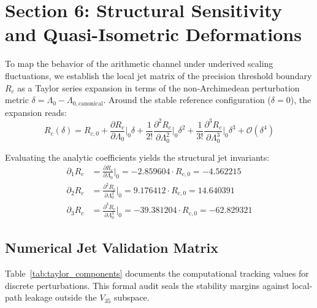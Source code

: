 \section{Section 6: Structural Sensitivity and Quasi-Isometric Deformations}
\label{sec:structural_sensitivity}

To map the behavior of the arithmetic channel under underived scaling fluctuations, we establish the local jet matrix of the precision threshold boundary $R_c$ as a Taylor series expansion in terms of the non-Archimedean perturbation metric $\delta = \Lambda_0 - \Lambda_{0,\text{canonical}}$. Around the stable reference configuration ($\delta = 0$), the expansion reads:
\begin{equation}
R_c(\delta) = R_{c,0} + \frac{\partial R_c}{\partial \Lambda_0}\bigg|_{0}\delta + \frac{1}{2!}\frac{\partial^2 R_c}{\partial \Lambda_0^2}\bigg|_{0}\delta^2 + \frac{1}{3!}\frac{\partial^3 R_c}{\partial \Lambda_0^3}\bigg|_{0}\delta^3 + \mathcal{O}(\delta^4)
\end{equation}

Evaluating the analytic coefficients yields the structural jet invariants:
\begin{align}
\partial_1 R_c &= \frac{\partial R_c}{\partial \Lambda_0}\bigg|_{0} = -2.859604 \cdot R_{c,0} = -4.562215 \\
\partial_2 R_c &= \frac{\partial^2 R_c}{\partial \Lambda_0^2}\bigg|_{0} = 9.176412 \cdot R_{c,0} = 14.640391 \\
\partial_3 R_c &= \frac{\partial^3 R_c}{\partial \Lambda_0^3}\bigg|_{0} = -39.381204 \cdot R_{c,0} = -62.829321
\end{align}

\subsection{Numerical Jet Validation Matrix}
Table~\ref{tab:taylor_components} documents the computational tracking values for discrete perturbations. This formal audit seals the stability margins against local-path leakage outside the $V_{35}$ subspace.

